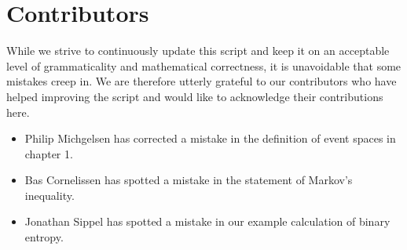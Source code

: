 \section*{Contributors}
While we strive to continuously update this script and keep it on an acceptable level of grammaticality and mathematical correctness, it is unavoidable that some
mistakes creep in. We are therefore utterly grateful to our contributors who have helped improving the script and would like to acknowledge their contributions here.
\begin{itemize}
\item Philip Michgelsen has corrected a mistake in the definition of event spaces in chapter 1.
\item Bas Cornelissen has spotted a mistake in the statement of Markov's inequality.
\item Jonathan Sippel has spotted a mistake in our example calculation of binary entropy.
\end{itemize}